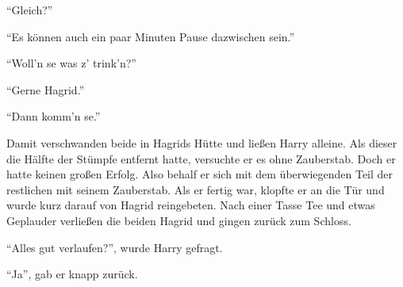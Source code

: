 \enquote{Gleich?}

\enquote{Es können auch ein paar Minuten Pause dazwischen sein.}

\enquote{Woll’n se was z’ trink’n?}

\enquote{Gerne Hagrid.}

\enquote{Dann komm’n se.}

Damit verschwanden beide in Hagrids Hütte und ließen Harry alleine. Als dieser die Hälfte der Stümpfe entfernt hatte, versuchte er es ohne Zauberstab. Doch er hatte keinen großen Erfolg. Also behalf er sich mit dem überwiegenden Teil der restlichen mit seinem Zauberstab. Als er fertig war, klopfte er an die Tür und wurde kurz darauf von Hagrid reingebeten. Nach einer Tasse Tee und etwas Geplauder verließen die beiden Hagrid und gingen zurück zum Schloss.

\enquote{Alles gut verlaufen?}, wurde Harry gefragt.

\enquote{Ja}, gab er knapp zurück.
